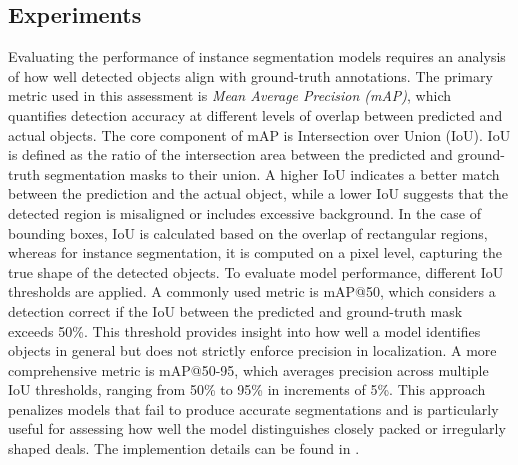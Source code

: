 \documentclass[11pt]{article}
\begin{document}
\subsection{Experiments}
Evaluating the performance of instance segmentation models requires an analysis of how well detected objects align with ground-truth annotations. The primary metric used in this assessment is \emph{Mean Average Precision (mAP)}, which quantifies detection accuracy at different levels of overlap between predicted and actual objects. The core component of mAP is Intersection over Union (IoU). IoU is defined as the ratio of the intersection area between the predicted and ground-truth segmentation masks to their union. A higher IoU indicates a better match between the prediction and the actual object, while a lower IoU suggests that the detected region is misaligned or includes excessive background. In the case of bounding boxes, IoU is calculated based on the overlap of rectangular regions, whereas for instance segmentation, it is computed on a pixel level, capturing the true shape of the detected objects. To evaluate model performance, different IoU thresholds are applied. A commonly used metric is mAP@50, which considers a detection correct if the IoU between the predicted and ground-truth mask exceeds 50\%. This threshold provides insight into how well a model identifies objects in general but does not strictly enforce precision in localization. A more comprehensive metric is mAP@50-95, which averages precision across multiple IoU thresholds, ranging from 50\% to 95\% in increments of 5\%. This approach penalizes models that fail to produce accurate segmentations and is particularly useful for assessing how well the model distinguishes closely packed or irregularly shaped deals. The implemention details can be found in .
\end{document}
